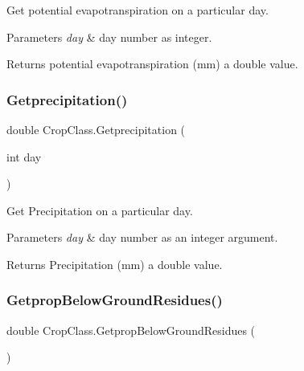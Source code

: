 Get potential evapotranspiration on a particular day. 


\begin{DoxyParams}{Parameters}
{\em day} & day number as integer. \\
\hline
\end{DoxyParams}
\begin{DoxyReturn}{Returns}
potential evapotranspiration (mm) a double value. 
\end{DoxyReturn}
\mbox{\label{class_crop_class_a00394efec24c23157da2658408cc4271}} 
\subsubsection{\texorpdfstring{Getprecipitation()}{Getprecipitation()}}
{\footnotesize\ttfamily double Crop\+Class.\+Getprecipitation (\begin{DoxyParamCaption}\item[{int}]{day }\end{DoxyParamCaption})\hspace{0.3cm}{\ttfamily [inline]}}



Get Precipitation on a particular day. 


\begin{DoxyParams}{Parameters}
{\em day} & day number as an integer argument. \\
\hline
\end{DoxyParams}
\begin{DoxyReturn}{Returns}
Precipitation (mm) a double value. 
\end{DoxyReturn}
\mbox{\label{class_crop_class_a6da6484ef8ad9d8b8ea5e65f2ba78a6c}} 
\subsubsection{\texorpdfstring{GetpropBelowGroundResidues()}{GetpropBelowGroundResidues()}}
{\footnotesize\ttfamily double Crop\+Class.\+Getprop\+Below\+Ground\+Residues (\begin{DoxyParamCaption}{ }\end{DoxyParamCaption})\hspace{0.3cm}{\ttfamily [inline]}}



